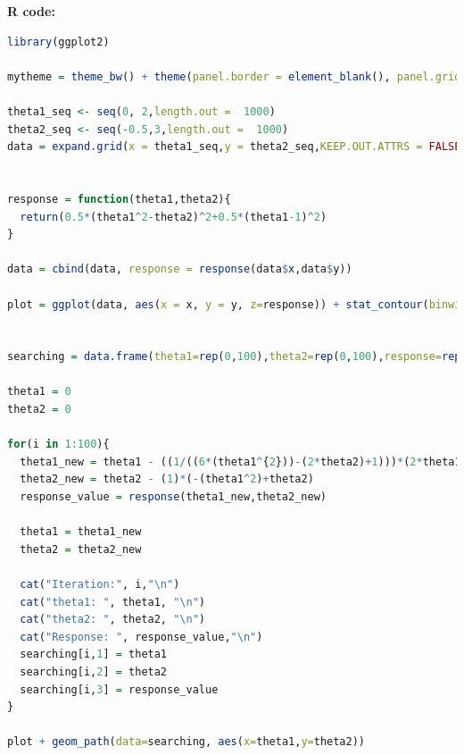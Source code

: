 \documentclass[12pt,a4paper]{article}%
\theoremstyle{definition}
\theoremstyle{plain}
\numberwithin{equation}{section}
\begin{document}
\textbf{R code:}
\tiny
\begin{lstlisting}[language=R]
library(ggplot2)

mytheme = theme_bw() + theme(panel.border = element_blank(), panel.grid.major = element_blank())

theta1_seq <- seq(0, 2,length.out =  1000)
theta2_seq <- seq(-0.5,3,length.out =  1000)
data = expand.grid(x = theta1_seq,y = theta2_seq,KEEP.OUT.ATTRS = FALSE)


response = function(theta1,theta2){
  return(0.5*(theta1^2-theta2)^2+0.5*(theta1-1)^2)
}

data = cbind(data, response = response(data$x,data$y))

plot = ggplot(data, aes(x = x, y = y, z=response)) + stat_contour(binwidth = 0.2)+mytheme


searching = data.frame(theta1=rep(0,100),theta2=rep(0,100),response=rep(0,100))

theta1 = 0
theta2 = 0

for(i in 1:100){
  theta1_new = theta1 - ((1/((6*(theta1^{2}))-(2*theta2)+1)))*(2*theta1^{3}-2*theta1*theta2+theta1-1)
  theta2_new = theta2 - (1)*(-(theta1^2)+theta2)
  response_value = response(theta1_new,theta2_new)
  
  theta1 = theta1_new
  theta2 = theta2_new
  
  cat("Iteration:", i,"\n")
  cat("theta1: ", theta1, "\n")
  cat("theta2: ", theta2, "\n")
  cat("Response: ", response_value,"\n")
  searching[i,1] = theta1
  searching[i,2] = theta2
  searching[i,3] = response_value
}

plot + geom_path(data=searching, aes(x=theta1,y=theta2))

\end{lstlisting}
\end{document}
